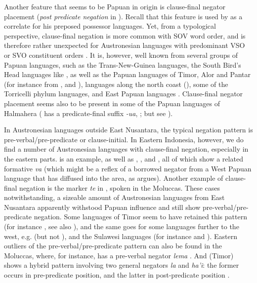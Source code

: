 Another feature that seems to be Papuan in origin is clause-final negator placement (\textit{post predicate negation} in \citealt{klamer2008east}). Recall that this feature is used by \citet{Himmelmann2005austronesian} as a correlate for his preposed possessor languages. Yet, from a typological perspective, clause-final negation is more common with SOV word order, and is therefore rather unexpected for Austronesian languages with predominant VSO or SVO constituent orders \citep{klamer2008east}. It is, however, well known from several groups of Papuan languages, such as the Trans-New-Guinea languages, the South Bird's Head languages like , as well as the Papuan languages of Timor, Alor and Pantar (for instance from ,  and ),  languages along the north coast (), some of the Torricelli phylum languages, and East Papuan languages \citep{klamer2008east}. Clause-final negator placement seems also to be present in some of the Papuan languages of Halmahera ( has a predicate-final suffix \textit{-ua}, \citealt{holton2003tobelo}; but see \citealt[131]{klamer2008east}).

In Austronesian languages outside East Nusantara, the typical negation pattern is pre-verbal/pre-predicate or clause-initial. In Eastern Indonesia, however, we do find a number of Austronesian languages with clause-final negation, especially in the eastern parts.  is an example, as well as , , and  \citep{gasser2014windesi}, all of which show a related formative \textit{va} (which might be a reflex of a borrowed negator from a West Papuan language that has diffused into the area, as \citet{reesink2002eastern} argues). Another example of clause-final negation is the marker \textit{te} in , spoken in the Moluccas. These cases notwithstanding, a sizeable amount of Austronesian languages from East Nusantara apparently withstood Papuan influence and still show pre-verbal/pre-predicate negation. Some languages of Timor seem to have retained this pattern (for instance , see also \citealt[132]{klamer2008east}), and the same goes for some languages further to the west, e.g.  (but not ), and the Sulawesi languages (for instance  and ). Eastern outliers of the pre-verbal/pre-predicate pattern can also be found in the Moluccas, where, for instance,  has a pre-verbal negator \textit{lema} \citep[140]{coward2005}. And  (Timor) shows a hybrid pattern involving two general negators \textit{la} and \textit{ha'i}: the former occurs in pre-predicate position, and the latter in post-predicate position \citep[228]{vanklinken1999grammar}.

